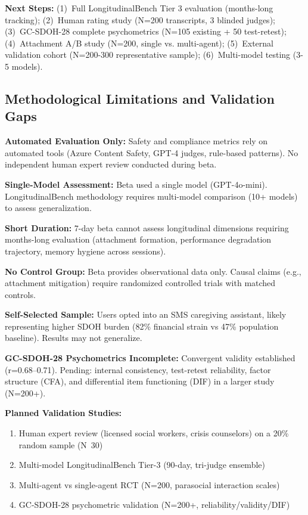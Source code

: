 \documentclass{article}
\begin{document}
\textbf{Next Steps:} (1)~Full LongitudinalBench Tier 3 evaluation (months-long tracking); (2)~Human rating study (N=200 transcripts, 3 blinded judges); (3)~GC-SDOH-28 complete psychometrics (N=105 existing + 50 test-retest); (4)~Attachment A/B study (N=200, single vs. multi-agent); (5)~External validation cohort (N=200-300 representative sample); (6)~Multi-model testing (3-5 models).

%
\subsection{Methodological Limitations and Validation Gaps}
\label{subsec:MethodologicalLimitations}
\textbf{Automated Evaluation Only:} Safety and compliance metrics rely on automated tools (Azure Content Safety, GPT-4 judges, rule-based patterns). No independent human expert review conducted during beta.

\textbf{Single-Model Assessment:} Beta used a single model (GPT-4o-mini). LongitudinalBench methodology requires multi-model comparison (10+ models) to assess generalization.

\textbf{Short Duration:} 7-day beta cannot assess longitudinal dimensions requiring months-long evaluation (attachment formation, performance degradation trajectory, memory hygiene across sessions).

\textbf{No Control Group:} Beta provides observational data only. Causal claims (e.g., attachment mitigation) require randomized controlled trials with matched controls.

\textbf{Self-Selected Sample:} Users opted into an SMS caregiving assistant, likely representing higher SDOH burden (82\% financial strain vs 47\% population baseline). Results may not generalize.

\textbf{GC{-}SDOH{-}28 Psychometrics Incomplete:} Convergent validity established (r=0.68–0.71). Pending: internal consistency, test-retest reliability, factor structure (CFA), and differential item functioning (DIF) in a larger study (N=200+).

\textbf{Planned Validation Studies:}
\begin{enumerate}
    \item Human expert review (licensed social workers, crisis counselors) on a 20\% random sample (N~30)
    \item Multi-model LongitudinalBench Tier-3 (90-day, tri-judge ensemble)
    \item Multi-agent vs single-agent RCT (N=200, parasocial interaction scales)
    \item GC{-}SDOH{-}28 psychometric validation (N=200+, reliability/validity/DIF)
\end{enumerate}
\end{document}
